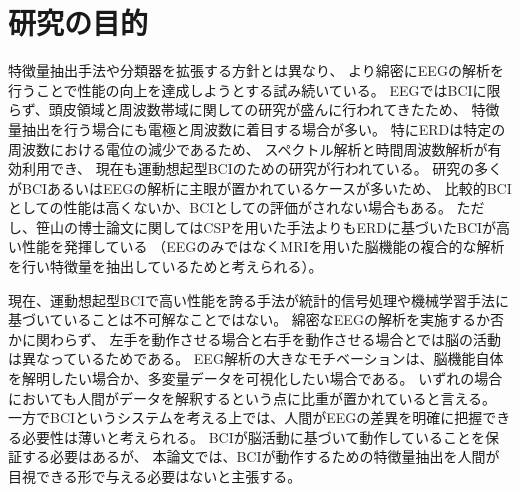 \section{研究の目的}
特徴量抽出手法や分類器を拡張する方針とは異なり、
より綿密にEEGの解析を行うことで性能の向上を達成しようとする試み続いている\cite{脳波解析BCI,脳波分析BCI,ERSBCI}。
EEGではBCIに限らず、頭皮領域と周波数帯域に関しての研究が盛んに行われてきたため、
特徴量抽出を行う場合にも電極と周波数に着目する場合が多い。
特にERDは特定の周波数における電位の減少であるため、
スペクトル解析と時間周波数解析が有効利用でき、
現在も運動想起型BCIのための研究が行われている\cite{時間周波数解析の比較}。
研究の多くがBCIあるいはEEGの解析に主眼が置かれているケースが多いため、
比較的BCIとしての性能は高くないか、BCIとしての評価がされない場合もある。
ただし、笹山の博士論文\cite{京大ドクター}に関してはCSPを用いた手法よりもERDに基づいたBCIが高い性能を発揮している
（EEGのみではなくMRIを用いた脳機能の複合的な解析を行い特徴量を抽出しているためと考えられる）。

現在、運動想起型BCIで高い性能を誇る手法が統計的信号処理や機械学習手法に基づいていることは不可解なことではない。
綿密なEEGの解析を実施するか否かに関わらず、
左手を動作させる場合と右手を動作させる場合とでは脳の活動は異なっているためである。
EEG解析の大きなモチベーションは、脳機能自体を解明したい場合か、多変量データを可視化したい場合である。
いずれの場合においても人間がデータを解釈するという点に比重が置かれていると言える。
一方でBCIというシステムを考える上では、人間がEEGの差異を明確に把握できる必要性は薄いと考えられる。
BCIが脳活動に基づいて動作していることを保証する必要はあるが、
本論文では、BCIが動作するための特徴量抽出を人間が目視できる形で与える必要はないと主張する。

